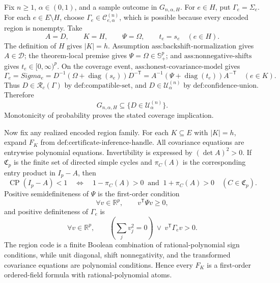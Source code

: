 Fix \(n\geq1\), \(\alpha\in(0,1)\), and a sample outcome in \(G_{n,\alpha,H}\). For \(e\in H\), put \(\Gamma_e=\Sigma_e\). For each \(e\in E\setminus H\), choose \(\Gamma_e\in\mathcal C^{(n)}_{e,\alpha}\), which is possible because every encoded region is nonempty. Take
\[
A=D,\qquad K=H,\qquad \Psi=\Omega,\qquad t_e=s_e\quad(e\in H).
\]
The definition of \(H\) gives \(|K|=h\). Assumption \(\text{ass:backshift-normalization}\) gives \(A\in\mathcal D\); the theorem-local premise gives \(\Psi=\Omega\in\mathbb S_+^p\); and \(\text{ass:nonnegative-shifts}\) gives \(t_e\in[0,\infty)^p\). On the coverage event, \(\text{ass:honest-covariance-model}\) gives
\[
\Gamma_e=Sigma_e
=D^{-1}(\Omega+\operatorname{diag}(s_e))D^{-\mathsf T}
=A^{-1}(\Psi+\operatorname{diag}(t_e))A^{-\mathsf T}
\quad(e\in K).
\]
Thus \(D\in\mathcal R_c(\Gamma)\) by \(\text{def:compatible-set}\), and \(D\in\mathcal U^{(n)}_\alpha\) by \(\text{def:confidence-union}\). Therefore
\[
G_{n,\alpha,H}\subseteq\{D\in\mathcal U^{(n)}_\alpha\}.
\]
Monotonicity of probability proves the stated coverage implication.

Now fix any realized encoded region family. For each \(K\subseteq E\) with \(|K|=h\), expand \(F_K\) from \(\text{def:certificate-inference-handle}\). All covariance equations are entrywise polynomial equations. Invertibility is expressed by \((\det A)^2>0\). If \(\mathfrak C_p\) is the finite set of directed simple cycles and \(\pi_C(A)\) is the corresponding entry product in \(I_p-A\), then
\[
\operatorname{CP}(I_p-A)<1
\quad\Longleftrightarrow\quad
1-\pi_C(A)>0\ \text{ and }\ 1+\pi_C(A)>0
\quad(C\in\mathfrak C_p).
\]
Positive semidefiniteness of \(\Psi\) is the first-order condition
\[
\forall v\in\mathbb R^p,\qquad v^{\mathsf T}\Psi v\geq0,
\]
and positive definiteness of \(\Gamma_e\) is
\[
\forall v\in\mathbb R^p,\qquad
\left(\sum_jv_j^2=0\right)\ \vee\ v^{\mathsf T}\Gamma_ev>0.
\]
The region code is a finite Boolean combination of rational-polynomial sign conditions, while unit diagonal, shift nonnegativity, and the transformed covariance equations are polynomial conditions. Hence every \(F_K\) is a first-order ordered-field formula with rational-polynomial atoms.

